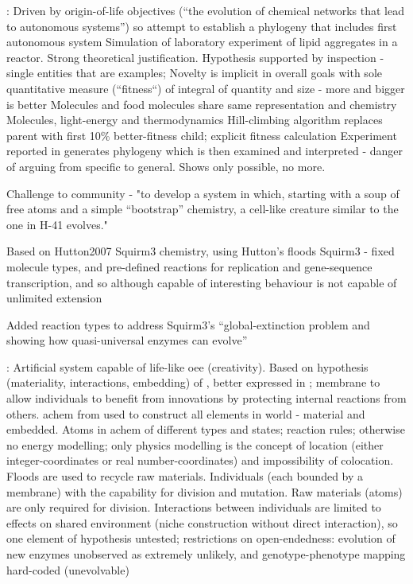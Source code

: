 \cite{Fernando:2008xy,Fernando:2007pf}:
Driven by origin-of-life objectives (``the evolution of chemical networks that lead to autonomous systems'') so attempt to establish a phylogeny that includes first autonomous system
Simulation of laboratory experiment of lipid aggregates in a reactor. Strong theoretical justification. Hypothesis supported by inspection - single entities that are examples; Novelty is implicit in overall goals with sole quantitative measure (``fitness``) of integral of quantity and size - more and bigger is better
Molecules and food molecules share same representation and chemistry
Molecules, light-energy and thermodynamics
Hill-climbing algorithm replaces parent with first 10\% better-fitness child; explicit fitness calculation
Experiment reported in \textcite{Fernando:2008xy} generates phylogeny which is then examined and interpreted - danger of arguing from specific to general. Shows only possible, no more.

\parencite{Lucht2012}

Challenge to community - "to develop a system in which, starting with a soup of free atoms and a simple ``bootstrap'' chemistry, a cell-like creature similar to the one in H-41 evolves."

Based on Hutton2007 Squirm3 chemistry, using Hutton's floods 
Squirm3 - fixed molecule types, and pre-defined reactions for replication and gene-sequence transcription, and so although capable of interesting behaviour is not capable of unlimited extension

Added reaction types to address Squirm3's ``global-extinction problem and showing how quasi-universal enzymes can evolve''

\cite{Hutton2007,Hutton2002}:
Artificial system capable of life-like \gls{oee} (creativity).
Based on hypothesis (materiality, interactions, embedding) of \textcite{Taylor2001}, better expressed in \textcite[p.341]{Hutton2002}; membrane to allow individuals to benefit from innovations by protecting internal reactions from others.
\Gls{achem} from \textcite{Hutton2002} used to construct all elements in world - material and embedded.
Atoms in \gls{achem} of different types and states; reaction rules; otherwise no energy modelling; only physics modelling is the concept of location (either integer-coordinates or real number-coordinates) and impossibility of colocation. Floods are used to recycle raw materials.
Individuals (each bounded by a membrane) with the capability for division and mutation. Raw materials (atoms) are only required for division.
Interactions between individuals are limited to effects on shared environment (niche construction without direct interaction), so one element of hypothesis untested; restrictions on open-endedness: evolution of new enzymes unobserved as extremely unlikely, and genotype-phenotype mapping hard-coded (unevolvable)

